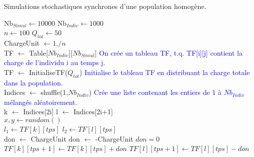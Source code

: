 
\begin{algorithm}
\caption{Simulations stochastiques synchrones d'une population homogène.}
\begin{algorithmic}

\State Nb$_{Simul} \gets 10000$
\State Nb$_{Indiv} \gets 1000$\\


\State $n \gets 100$
\State $Q_{tot} \gets 50$\\

\State ChargeUnit $\gets 1./n$\\

\State TF $\gets$ Table[$Nb_{Indiv}$][$Nb_{Simul}$]
\State \textcolor{blue}{On crée un tableau TF, t.q. TF[i][j] contient la charge de l'individu i au temps j.}\\
\State TF $\gets$ InitialiseTF($Q_{tot}$)
\State \textcolor{blue}{Initialise le tableau TF en distribuant la charge totale dans la population.}\\

	\State Indices $\gets$ shuffle(1,$Nb_{Indiv}$) 
	\State \textcolor{blue}{Crée une liste contenant les entiers de 1 à $Nb_{Indiv}$ mélangés aléatoirement.}\\
		\State k $\gets$ Indices[2i]
		\State l $\gets$ Indices[2i+1] \\
		
		\State $x,y \gets random()$\\
		
		\State $l_1 \gets TF[k][tps]$
		\State $l_2 \gets TF[l][tps]$\\
		
			\State don $\gets$ ChargeUnit 
			\State don $\gets$ -ChargeUnit 
		\Else
			\State $don=0$
		\EndIf \\
		
		\State $TF[k][tps+1] \gets TF[k][tps]+don$
        \State $TF[l][tps+1] \gets TF[l][tps]-don$\\
	\EndFor
\EndFor



\end{algorithmic}
\end{algorithm}


\clearpage

